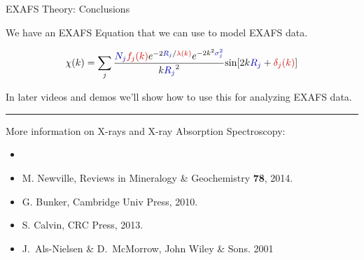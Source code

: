 \begin{slide}{EXAFS Theory:  Conclusions}
  
  \begin{cenpage}{110mm}
    We have an EXAFS Equation that we can use to model EXAFS data.

  \begin{center}
    \[ \chi(k) = \sum_j {\frac{{\Blue{N_j}} {\Red{f_j(k)}}
        e^{-2{\Blue{R_j}}/{\Red{\lambda(k)}}}
        e^{-2k^2{\Blue{\sigma_j^2}}}}{k{\Blue{R_j}}^2}
      {\sin[{2k{\Blue{R_j}} + {\Red{\delta_j(k)}}] }}} \]
  \end{center}

  \vmm
  In later videos and demos we'll show how to use this for
  analyzing EXAFS data.

  

  \vmm\vmm \hrule \vmm
  
  More information on X-rays and X-ray Absorption Spectroscopy:

  \begin{itemize}
  \item[] {}
  \item[] {} M. Newville, Reviews in  Mineralogy \& Geochemistry {\bf{78}}, 2014.
  \item[] {} G. Bunker, Cambridge Univ  Press,  2010.
  \item[] {} S. Calvin, CRC Press, 2013.
  \item[]  {}  J.~Als-Nielsen
    \& D.~McMorrow,  John Wiley \& Sons. 2001
    
  \end{itemize}

\end{cenpage}


 \vfill
\end{slide}
 
